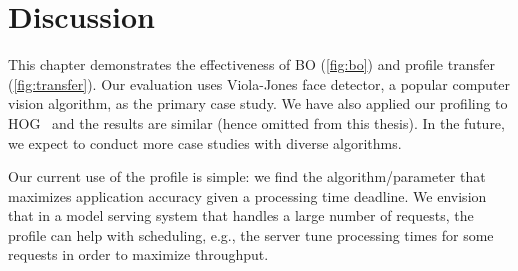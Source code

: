 \section{Discussion}
\label{sec:brt-discussion}

 This chapter demonstrates the effectiveness of BO
(\autoref{fig:bo}) and profile transfer (\autoref{fig:transfer}). Our evaluation
uses Viola-Jones face detector, a popular computer vision algorithm, as the
primary case study. We have also applied our profiling to
HOG~\cite{dalal2005histograms} and the results are similar (hence omitted from
this thesis). In the future, we expect to conduct more case studies with diverse
algorithms.

 Our current use of the profile is simple: we find the
algorithm/parameter that maximizes application accuracy given a processing time
deadline. We envision that in a model serving system that handles a large number
of requests, the profile can help with scheduling, e.g., the server tune
processing times for some requests in order to maximize throughput.

